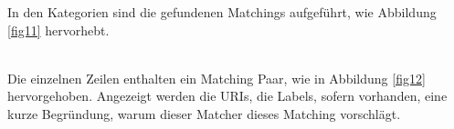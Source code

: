		\pagebreak[4]
		
		In den Kategorien sind die gefundenen Matchings aufgeführt, wie Abbildung
		\ref{fig11} hervorhebt.\\
		\begin{minipage}{\linewidth}
			\label{fig11}
		\end{minipage}
		\\
		Die einzelnen Zeilen enthalten ein Matching Paar, wie in Abbildung \ref{fig12}
		hervorgehoben. Angezeigt werden die URIs, die Labels, sofern vorhanden, eine
		kurze Begründung, warum dieser Matcher dieses Matching vorschlägt.\\
		\begin{minipage}{\linewidth}
			\label{fig12}  
		\end{minipage}
		
		\pagebreak[4]
		
